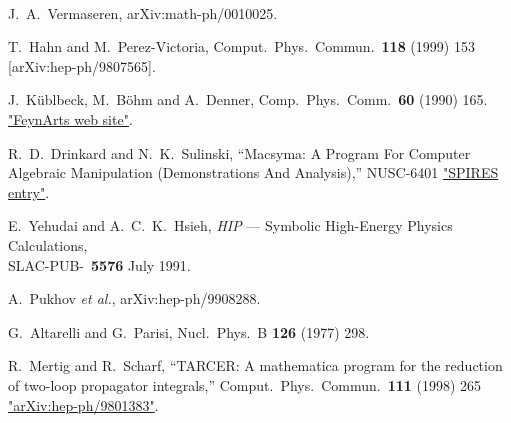 
~\vspace{3cm}

\begin{thebibliography}{99}

J.~A.~Vermaseren,
arXiv:math-ph/0010025.

T.~Hahn and M.~Perez-Victoria,
Comput.\ Phys.\ Commun.\  {\bf 118} (1999) 153
[arXiv:hep-ph/9807565].


 J.~K\"ublbeck, M.~B\"ohm and A.~Denner, 
Comp.~Phys.~Comm.~{\bf 60} (1990) 165.\\
\href{http://www.feynarts.de/}{"FeynArts web site"}.

R.~D.~Drinkard and N.~K.~Sulinski,
``Macsyma: A Program For Computer Algebraic Manipulation (Demonstrations And Analysis),''
NUSC-6401
\href{http://www.slac.stanford.edu/spires/find/hep/www?r=nusc-6401}{"SPIRES entry"}.

E.~Yehudai and A.~C.~K.~Hsieh,
{\sl HIP\/} --- Symbolic  High-Energy Physics Calculations, \\
SLAC-PUB-~{\bf 5576} July 1991.

A.~Pukhov {\it et al.},
arXiv:hep-ph/9908288.

G.~Altarelli and G.~Parisi,
Nucl.\ Phys.\ B {\bf 126} (1977) 298.

R.~Mertig and R.~Scharf,
``TARCER: A mathematica program for the reduction of two-loop propagator  integrals,''
Comput.\ Phys.\ Commun.\  {\bf 111} (1998) 265
\href{http://xxx.lanl.gov/abs/hep-ph/9801383}{"arXiv:hep-ph/9801383"}.


\end{thebibliography}

